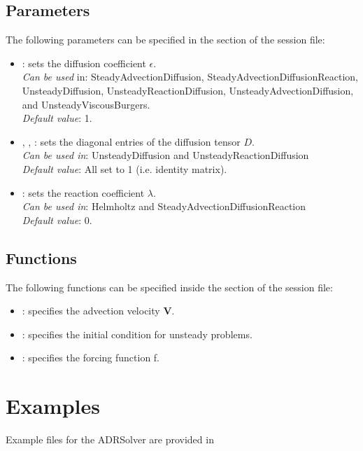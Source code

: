 \subsection{Parameters}

The following parameters can be specified in the  section of
the session file:
\begin{itemize}
\item {}: sets the diffusion coefficient $\epsilon$.\\
\textit{Can be used} in: SteadyAdvectionDiffusion, SteadyAdvectionDiffusionReaction, UnsteadyDiffusion, UnsteadyReactionDiffusion, UnsteadyAdvectionDiffusion, and UnsteadyViscousBurgers. \\
\textit{Default value}: 1.
\item  {}, , : sets the diagonal entries of the
diffusion tensor $D$. \\
\textit{Can be used in}: UnsteadyDiffusion and UnsteadyReactionDiffusion \\
\textit{Default value}: All set to 1 (i.e. identity matrix).
\item  {}: sets the reaction coefficient  $\lambda$. \\
\textit{Can be used in}: Helmholtz and SteadyAdvectionDiffusionReaction\\
\textit{Default value}: 0.
\end{itemize}

\subsection{Functions}

The following functions can be specified inside the  section
of the session file:

\begin{itemize}
\item {}: specifies the advection velocity $\mathbf{V}$.
\item {}: specifies the initial condition for unsteady problems.
\item {}: specifies the forcing function f.
\end{itemize}

\section{Examples}
Example files for the ADRSolver are provided in


